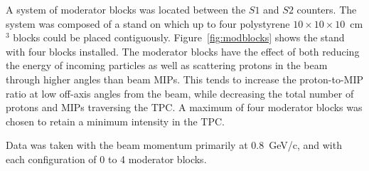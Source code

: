 A system of moderator blocks was located between the $\mathit{S1}$ and $\mathit{S2}$ counters.
The system was composed of a stand on which up to four polystyrene $10\times10\times10$~cm$^3$ blocks could be placed contiguously.
Figure~\ref{fig:modblocks} shows the stand with four blocks installed.
The moderator blocks have the effect of both reducing the energy of incoming particles as well as scattering protons in the beam through higher angles than beam MIPs.
This tends to increase the proton-to-MIP ratio at low off-axis angles from the beam, while decreasing the total number of protons and MIPs traversing the TPC.
A maximum of four moderator blocks was chosen to retain a minimum intensity in the TPC.

Data was taken with the beam momentum primarily at 0.8~GeV/c, and with each configuration of 0 to 4 moderator blocks.



